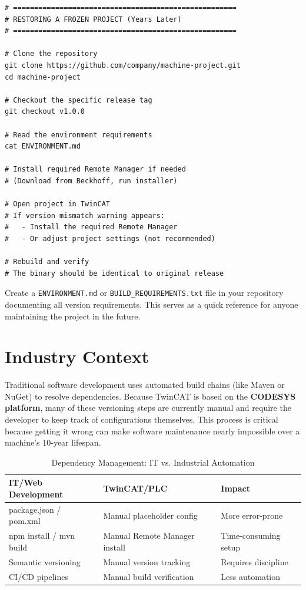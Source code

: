 \documentclass[11pt,a4paper]{article}
\begin{document}
\begin{lstlisting}[style=bashstyle]
# =====================================================
# RESTORING A FROZEN PROJECT (Years Later)
# =====================================================

# Clone the repository
git clone https://github.com/company/machine-project.git
cd machine-project

# Checkout the specific release tag
git checkout v1.0.0

# Read the environment requirements
cat ENVIRONMENT.md

# Install required Remote Manager if needed
# (Download from Beckhoff, run installer)

# Open project in TwinCAT
# If version mismatch warning appears:
#   - Install the required Remote Manager
#   - Or adjust project settings (not recommended)

# Rebuild and verify
# The binary should be identical to original release
\end{lstlisting}

\begin{tipbox}
Create a \texttt{ENVIRONMENT.md} or \texttt{BUILD\_REQUIREMENTS.txt} file in your repository documenting all version requirements. This serves as a quick reference for anyone maintaining the project in the future.
\end{tipbox}

\section{Industry Context}

Traditional software development uses automated build chains (like Maven or NuGet) to resolve dependencies. Because TwinCAT is based on the \textbf{CODESYS platform}, many of these versioning steps are currently manual and require the developer to keep track of configurations themselves. This process is critical because getting it wrong can make software maintenance nearly impossible over a machine's 10-year lifespan.

\begin{table}[h]
\centering
\begin{tabular}{@{}lll@{}}
\toprule
\textbf{IT/Web Development} & \textbf{TwinCAT/PLC} & \textbf{Impact} \\
\midrule
package.json / pom.xml & Manual placeholder config & More error-prone \\
npm install / mvn build & Manual Remote Manager install & Time-consuming setup \\
Semantic versioning & Manual version tracking & Requires discipline \\
CI/CD pipelines & Manual build verification & Less automation \\
\bottomrule
\end{tabular}
\caption{Dependency Management: IT vs. Industrial Automation}
\end{table}
\end{document}
